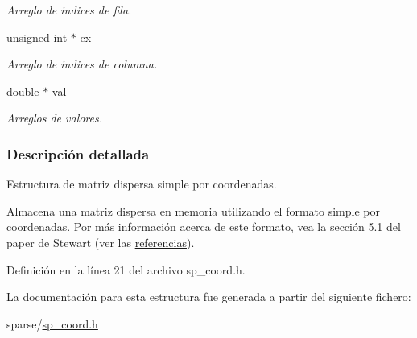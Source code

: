 \begin{CompactItemize}
\begin{CompactList}\small\item\em Arreglo de indices de fila. \item\end{CompactList}\item 
\hypertarget{structsp__coord_cdb4f5d3b6a4a24dfaf7aa94894d3c52}{
unsigned int $\ast$ \hyperlink{structsp__coord_cdb4f5d3b6a4a24dfaf7aa94894d3c52}{cx}}
\label{structsp__coord_cdb4f5d3b6a4a24dfaf7aa94894d3c52}

\begin{CompactList}\small\item\em Arreglo de indices de columna. \item\end{CompactList}\item 
\hypertarget{structsp__coord_bf936aab79fa2aefba9c7d42e2ee401c}{
double $\ast$ \hyperlink{structsp__coord_bf936aab79fa2aefba9c7d42e2ee401c}{val}}
\label{structsp__coord_bf936aab79fa2aefba9c7d42e2ee401c}

\begin{CompactList}\small\item\em Arreglos de valores. \item\end{CompactList}\end{CompactItemize}


\subsubsection{Descripción detallada}
Estructura de matriz dispersa simple por coordenadas. 

Almacena una matriz dispersa en memoria utilizando el formato simple por coordenadas. Por más información acerca de este formato, vea la sección 5.1 del paper de Stewart (ver las \hyperlink{index_refsec}{referencias}). 

Definición en la línea 21 del archivo sp\_\-coord.h.

La documentación para esta estructura fue generada a partir del siguiente fichero:\begin{CompactItemize}
\item 
sparse/\hyperlink{sp__coord_8h}{sp\_\-coord.h}\end{CompactItemize}
